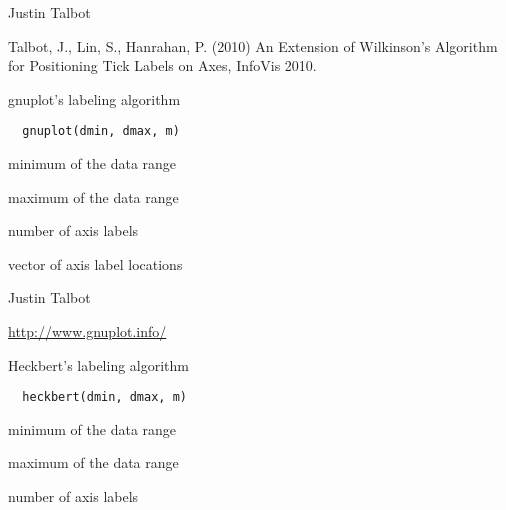 \documentclass[letterpaper]{book}
\begin{document}
%
\begin{Author}\relax
Justin Talbot 
\end{Author}
%
\begin{References}\relax
Talbot, J., Lin, S., Hanrahan, P. (2010) An Extension of
Wilkinson's Algorithm for Positioning Tick Labels on
Axes, InfoVis 2010.
\end{References}
%
\begin{Description}\relax
gnuplot's labeling algorithm
\end{Description}
%
\begin{Usage}
\begin{verbatim}
  gnuplot(dmin, dmax, m)
\end{verbatim}
\end{Usage}
%
\begin{Arguments}
\begin{ldescription}
\item[\code{dmin}] minimum of the data range

\item[\code{dmax}] maximum of the data range

\item[\code{m}] number of axis labels
\end{ldescription}
\end{Arguments}
%
\begin{Value}
vector of axis label locations
\end{Value}
%
\begin{Author}\relax
Justin Talbot 
\end{Author}
%
\begin{References}\relax
\url{http://www.gnuplot.info/}
\end{References}
%
\begin{Description}\relax
Heckbert's labeling algorithm
\end{Description}
%
\begin{Usage}
\begin{verbatim}
  heckbert(dmin, dmax, m)
\end{verbatim}
\end{Usage}
%
\begin{Arguments}
\begin{ldescription}
\item[\code{dmin}] minimum of the data range

\item[\code{dmax}] maximum of the data range

\item[\code{m}] number of axis labels
\end{ldescription}
\end{Arguments}
\end{document}
